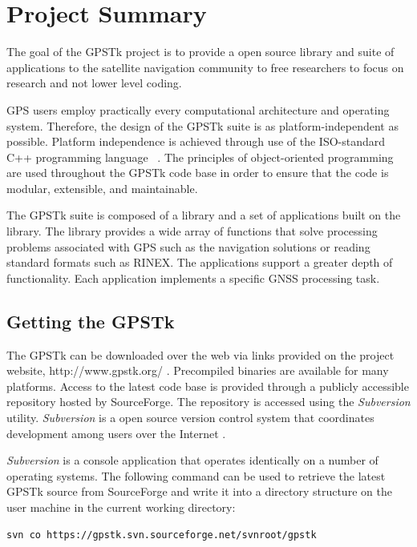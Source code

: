 \documentclass[letterpaper,ugly,10pt]{ion-gps}
\newcommand{\gpstkapp}[1]{\textit{\mbox{#1}}}
\begin{document}
\section*{Project Summary}

The goal of the GPSTk project is to provide a open source library and suite of applications to the satellite navigation community to free researchers to focus on research and not lower level coding.

GPS users employ practically every computational architecture and operating system. Therefore, the design of the GPSTk suite is as platform-independent as possible. Platform independence is achieved through use of the ISO-standard C++ programming language~ \cite{iso-14882-2003}. The principles of object-oriented programming are used throughout the GPSTk code base in order to ensure that the code is modular, extensible, and maintainable.

The GPSTk suite is composed of a library and a set of
applications built on the library. The library provides a wide array of functions that solve processing problems associated with GPS such as the navigation solutions or reading standard formats such as RINEX. The applications support a greater depth of functionality. Each application implements a specific GNSS processing task.

\subsection*{Getting the GPSTk}

The GPSTk can be downloaded over the web via links provided on the project
website, http://www.gpstk.org/ . Precompiled binaries are available for many platforms. 
Access to the latest code base is provided through a
publicly accessible repository hosted by SourceForge.  The repository is 
accessed using the \gpstkapp{Subversion} utility.  \gpstkapp{Subversion} is a
open source version control system that coordinates development among
users over the Internet \cite{subversion, subversionbook}.

\gpstkapp{Subversion} is a console application that operates identically on a number
of operating systems.  The following command can be used to retrieve the
latest GPSTk source from SourceForge and write it into a directory structure on
the user machine in the current working directory:

\begin{scriptsize}
\begin{lstlisting}
svn co https://gpstk.svn.sourceforge.net/svnroot/gpstk
\end{lstlisting}
\end{scriptsize}
\end{document}
